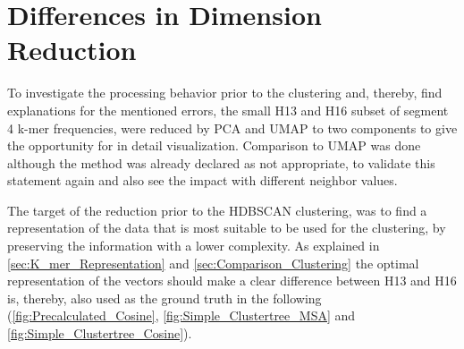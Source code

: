 \section{Differences in Dimension Reduction} \label{sec:Dimension_Reduction}

To investigate the processing behavior prior to the clustering and, thereby, find explanations for the mentioned errors, the small H13 and H16 subset of segment 4 k-mer frequencies, were reduced by \gls{PCA} and \gls{UMAP} to two components to give the opportunity for in detail visualization. Comparison to \gls{UMAP} was done although the method was already declared as not appropriate, to validate this statement again and also see the impact with different neighbor values. 

The target of the reduction prior to the \gls{HDBSCAN} clustering, was to find a representation of the data that is most suitable to be used for the clustering, by preserving the information with a lower complexity. As explained in \autoref{sec:K_mer_Representation} and \autoref{sec:Comparison_Clustering} the optimal representation of the vectors should make a clear difference between H13 and H16 is, thereby, also used as the ground truth in the following (\autoref{fig:Precalculated_Cosine}, \autoref{fig:Simple_Clustertree_MSA} and \autoref{fig:Simple_Clustertree_Cosine}).

